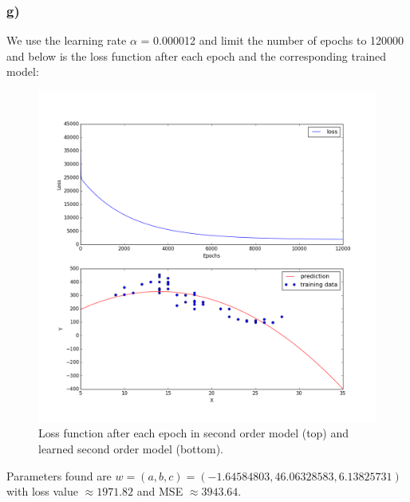 \documentclass{article}
\begin{document}
\subsubsection*{g)}
We use the learning rate $\alpha$ = 0.000012 and  limit the number of epochs to 120000 and below is the loss function after each epoch and the corresponding trained model:
\begin{figure}[H]
	\centering
	\includegraphics[scale=0.3]{31g.png}
	\caption{Loss function after each epoch in second order model (top) and learned second order model (bottom).}
	\label{fig4}
\end{figure}
Parameters found are $w = (a, b, c) = (-1.64584803,  46.06328583,   6.13825731)$ with loss value $\approx 1971.82$ and MSE $\approx 3943.64$.\\
\end{document}
